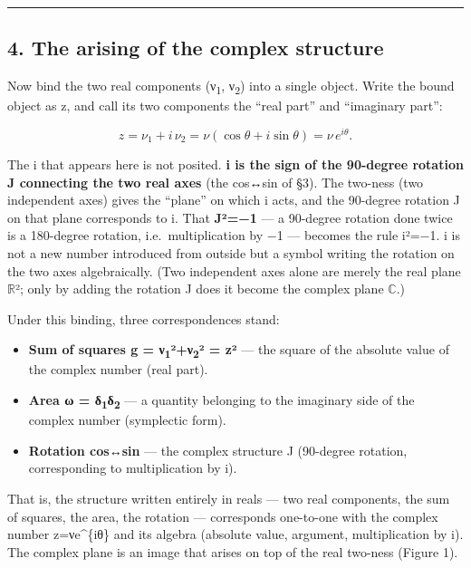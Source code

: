 \documentclass[11pt]{ltjsarticle}
\providecommand{\tightlist}{\setlength{\itemsep}{0pt}\setlength{\parskip}{0pt}}
\begin{document}
\begin{center}\rule{0.5\linewidth}{0.5pt}\end{center}

\subsection{4. The arising of the complex
structure}\label{the-arising-of-the-complex-structure}

Now bind the two real components (ν\textsubscript{1}, ν\textsubscript{2}) into a single object. Write
the bound object as z, and call its two components the ``real part'' and
``imaginary part'':

\[z = \nu_1 + i\,\nu_2 = \nu(\cos\theta + i\sin\theta) = \nu\,e^{i\theta}.\]

The i that appears here is not posited. \textbf{i is the sign of the
90-degree rotation J connecting the two real axes} (the cos↔sin of §3).
The two-ness (two independent axes) gives the ``plane'' on which i acts,
and the 90-degree rotation J on that plane corresponds to i. That
\textbf{J²=−1} --- a 90-degree rotation done twice is a 180-degree
rotation, i.e.~multiplication by −1 --- becomes the rule i²=−1. i is not
a new number introduced from outside but a symbol writing the rotation
on the two axes algebraically. (Two independent axes alone are merely
the real plane $\mathbb{R}$²; only by adding the rotation J does it become the
complex plane $\mathbb{C}$.)

Under this binding, three correspondences stand:

\begin{itemize}
\tightlist
\item
  \textbf{Sum of squares g = ν\textsubscript{1}²+ν\textsubscript{2}² = \textbar z\textbar²} --- the
  square of the absolute value of the complex number (real part).
\item
  \textbf{Area ω = δ\textsubscript{1}δ\textsubscript{2}} --- a quantity belonging to the imaginary side
  of the complex number (symplectic form).
\item
  \textbf{Rotation cos↔sin} --- the complex structure J (90-degree
  rotation, corresponding to multiplication by i).
\end{itemize}

That is, the structure written entirely in reals --- two real
components, the sum of squares, the area, the rotation --- corresponds
one-to-one with the complex number z=νe\^{}\{iθ\} and its algebra
(absolute value, argument, multiplication by i). The complex plane is an
image that arises on top of the real two-ness (Figure 1).
\end{document}
